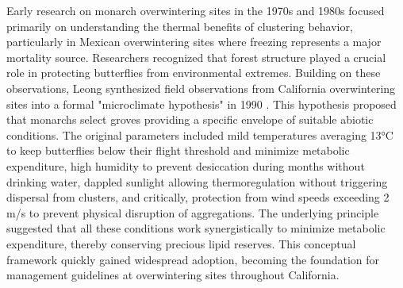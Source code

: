 Early research on monarch overwintering sites in the 1970s and 1980s focused primarily on understanding the thermal benefits of clustering behavior, particularly in Mexican overwintering sites where freezing represents a major mortality source. Researchers recognized that forest structure played a crucial role in protecting butterflies from environmental extremes. Building on these observations, Leong synthesized field observations from California overwintering sites into a formal "microclimate hypothesis" in 1990 \citep{leongMicroenvironmentalFactorsAssociated1990a}. This hypothesis proposed that monarchs select groves providing a specific envelope of suitable abiotic conditions. The original parameters included mild temperatures averaging 13°C to keep butterflies below their flight threshold and minimize metabolic expenditure, high humidity to prevent desiccation during months without drinking water, dappled sunlight allowing thermoregulation without triggering dispersal from clusters, and critically, protection from wind speeds exceeding 2 m/s to prevent physical disruption of aggregations. The underlying principle suggested that all these conditions work synergistically to minimize metabolic expenditure, thereby conserving precious lipid reserves. This conceptual framework quickly gained widespread adoption, becoming the foundation for management guidelines at overwintering sites throughout California.

